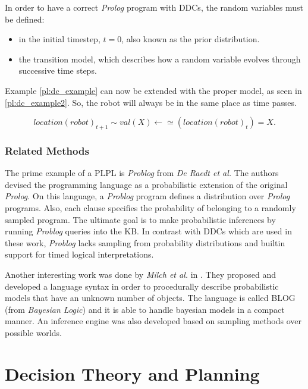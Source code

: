 In order to have a correct \textit{Prolog} program with \glspl{DDC}, the random
variables must be defined:
\begin{itemize}
  \item in the initial timestep, $t=0$,  also known as the prior distribution.
  \item the transition model, which describes how a random variable evolves
  through successive time steps.
\end{itemize}

Example \ref{pl:dc_example} can now be extended with the proper model, as seen
in \ref{pl:dc_example2}. So, the robot will always be in the same place as time
passes.

\begin{equation}
    location(robot)_{t+1} \sim val(X) \leftarrow \simeq(location(robot)_t) = X.
    \label{pl:dc_example2}
\end{equation}


\subsubsection{Related Methods}

The prime example of a \gls{PLPL} is \textit{Problog} \cite{de2007problog} from \textit{De Raedt et al.}
The authors devised the programming language as a probabilistic extension of the original 
\textit{Prolog}. On this language, a \textit{Problog} program defines a distribution over 
\textit{Prolog} programs. Also, each clause specifies the probability of belonging to a randomly 
sampled program. The ultimate goal is to make probabilistic inferences by running \textit{Problog}
queries into the \gls{KB}. 
In contrast with \glspl{DDC} which are used in these work, \textit{Problog} lacks sampling from
probability distributions and builtin support for timed logical interpretations.

Another interesting work was done by \textit{Milch et al.} in \cite{milch20071}. 
They proposed and developed a language syntax in order to procedurally describe probabilistic models
that have an unknown number of objects. The language is called BLOG (from \textit{Bayesian Logic}) and
it is able to handle bayesian models in a compact manner. An inference engine was also developed based
on sampling methods over possible worlds.

\section{Decision Theory and Planning}

